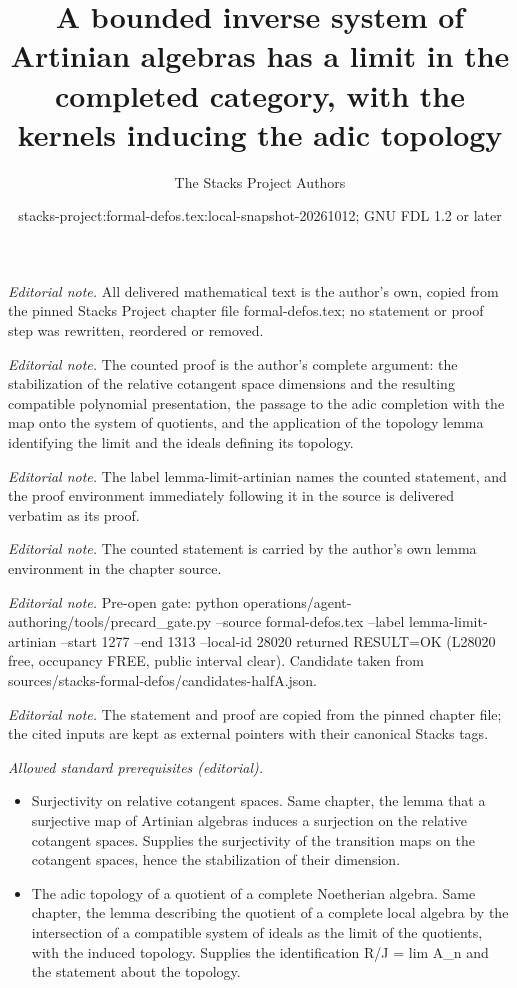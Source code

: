 \documentclass[10pt,a4paper]{amsart}
\title{A bounded inverse system of Artinian algebras has a limit in the completed category, with the kernels inducing the adic topology}
\author{The Stacks Project Authors}
\date{stacks-project:formal-defos.tex:local-snapshot-20261012; GNU FDL 1.2 or later}
\theoremstyle{plain}
\theoremstyle{definition}
\theoremstyle{remark}
\numberwithin{equation}{subsection}
\begin{document}
\maketitle
\noindent\textit{Editorial note.} All delivered mathematical text is the author's own, copied from the pinned Stacks Project chapter file formal-defos.tex; no statement or proof step was rewritten, reordered or removed.\par\medskip
\noindent\textit{Editorial note.} The counted proof is the author's complete argument: the stabilization of the relative cotangent space dimensions and the resulting compatible polynomial presentation, the passage to the adic completion with the map onto the system of quotients, and the application of the topology lemma identifying the limit and the ideals defining its topology.\par\medskip
\noindent\textit{Editorial note.} The label lemma-limit-artinian names the counted statement, and the proof environment immediately following it in the source is delivered verbatim as its proof.\par\medskip
\noindent\textit{Editorial note.} The counted statement is carried by the author's own lemma environment in the chapter source.\par\medskip
\noindent\textit{Editorial note.} Pre-open gate: python operations/agent-authoring/tools/precard\_gate.py --source formal-defos.tex --label lemma-limit-artinian --start 1277 --end 1313 --local-id 28020 returned RESULT=OK (L28020 free, occupancy FREE, public interval clear). Candidate taken from sources/stacks-formal-defos/candidates-halfA.json.\par\medskip
\noindent\textit{Editorial note.} The statement and proof are copied from the pinned chapter file; the cited inputs are kept as external pointers with their canonical Stacks tags.\par\medskip
\noindent\textit{Allowed standard prerequisites (editorial).}\begin{itemize}
\item Surjectivity on relative cotangent spaces. Same chapter, the lemma that a surjective map of Artinian algebras induces a surjection on the relative cotangent spaces. Supplies the surjectivity of the transition maps on the cotangent spaces, hence the stabilization of their dimension.
\item The adic topology of a quotient of a complete Noetherian algebra. Same chapter, the lemma describing the quotient of a complete local algebra by the intersection of a compatible system of ideals as the limit of the quotients, with the induced topology. Supplies the identification R/J = lim A\_n and the statement about the topology.
\end{itemize}\medskip
\end{document}
